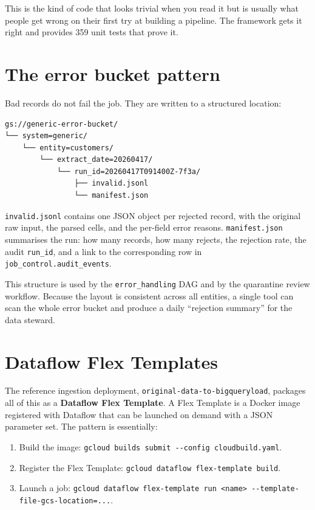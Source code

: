 \documentclass[
  11pt,
  british,
  oneside]{book}
\providecommand{\tightlist}{%
  \setlength{\itemsep}{0pt}\setlength{\parskip}{0pt}}
\begin{document}
This is the kind of code that looks trivial when you read it but is
usually what people get wrong on their first try at building a pipeline.
The framework gets it right and provides 359 unit tests that prove it.

\hypertarget{the-error-bucket-pattern}{%
\section{The error bucket pattern}\label{the-error-bucket-pattern}}

Bad records do not fail the job. They are written to a structured
location:

\begin{verbatim}
gs://generic-error-bucket/
└── system=generic/
    └── entity=customers/
        └── extract_date=20260417/
            └── run_id=20260417T091400Z-7f3a/
                ├── invalid.jsonl
                └── manifest.json
\end{verbatim}

\texttt{invalid.jsonl} contains one JSON object per rejected record,
with the original raw input, the parsed cells, and the per-field error
reasons. \texttt{manifest.json} summarises the run: how many records,
how many rejects, the rejection rate, the audit \texttt{run\_id}, and a
link to the corresponding row in \texttt{job\_control.audit\_events}.

This structure is used by the \texttt{error\_handling} DAG and by the
quarantine review workflow. Because the layout is consistent across all
entities, a single tool can scan the whole error bucket and produce a
daily ``rejection summary'' for the data steward.

\hypertarget{dataflow-flex-templates}{%
\section{Dataflow Flex Templates}\label{dataflow-flex-templates}}

The reference ingestion deployment,
\texttt{original-data-to-bigqueryload}, packages all of this as a
\textbf{Dataflow Flex Template}. A Flex
Template is a Docker image registered with Dataflow that can be launched
on demand with a JSON parameter set. The pattern is essentially:

\begin{enumerate}
\def\labelenumi{\arabic{enumi}.}
\tightlist
\item
  Build the image:
  \texttt{gcloud\ builds\ submit\ -\/-config\ cloudbuild.yaml}.
\item
  Register the Flex Template:
  \texttt{gcloud\ dataflow\ flex-template\ build}.
\item
  Launch a job:
  \texttt{gcloud\ dataflow\ flex-template\ run\ \textless{}name\textgreater{}\ -\/-template-file-gcs-location=...}.
\end{enumerate}
\end{document}
